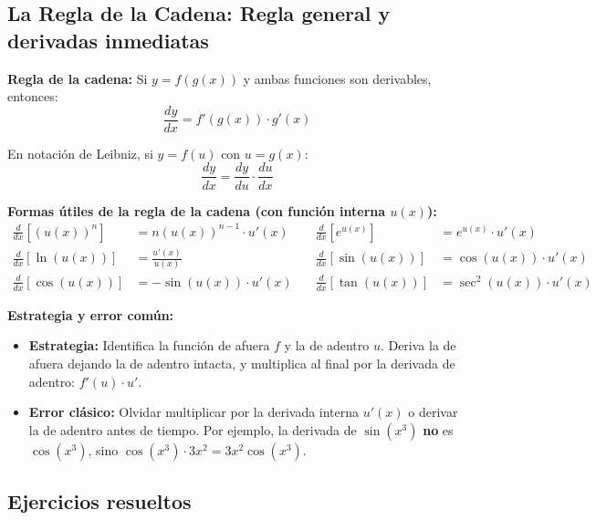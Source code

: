 \documentclass[12pt, letterpaper]{article}
\begin{document}
\subsection{La Regla de la Cadena: Regla general y derivadas inmediatas}

\begin{cuadroteoria}
  \textbf{Regla de la cadena:} Si $y = f(g(x))$ y ambas funciones son derivables, entonces:
  $$\frac{dy}{dx} = f'(g(x)) \cdot g'(x)$$

  En notación de Leibniz, si $y = f(u)$ con $u = g(x)$:
  $$\frac{dy}{dx} = \frac{dy}{du} \cdot \frac{du}{dx}$$
\end{cuadroteoria}

\begin{cuadrosolucion}
  \textbf{Formas útiles de la regla de la cadena (con función interna $u(x)$):}
  \begin{align*}
    \frac{d}{dx}[(u(x))^n]   & = n(u(x))^{n-1} \cdot u'(x) & \quad \frac{d}{dx}[e^{u(x)}]   & = e^{u(x)} \cdot u'(x)     \\[4pt]
    \frac{d}{dx}[\ln(u(x))]  & = \frac{u'(x)}{u(x)}        & \quad \frac{d}{dx}[\sin(u(x))] & = \cos(u(x)) \cdot u'(x)   \\[4pt]
    \frac{d}{dx}[\cos(u(x))] & = -\sin(u(x)) \cdot u'(x)   & \quad \frac{d}{dx}[\tan(u(x))] & = \sec^2(u(x)) \cdot u'(x)
  \end{align*}
\end{cuadrosolucion}

\begin{cuadroadvertencia}
  \textbf{Estrategia y error común:}
  \begin{itemize}[leftmargin=*]
    \item \textbf{Estrategia:} Identifica la función de afuera $f$ y la de adentro $u$. Deriva la de afuera dejando la de adentro intacta, y multiplica al final por la derivada de adentro: $f'(u) \cdot u'$.
    \item \textbf{Error clásico:} Olvidar multiplicar por la derivada interna $u'(x)$ o derivar la de adentro antes de tiempo. Por ejemplo, la derivada de $\sin(x^3)$ \textbf{no} es $\cos(x^3)$, sino $\cos(x^3) \cdot 3x^2 = 3x^2 \cos(x^3)$.
  \end{itemize}
\end{cuadroadvertencia}

\subsection{Ejercicios resueltos}
\end{document}

